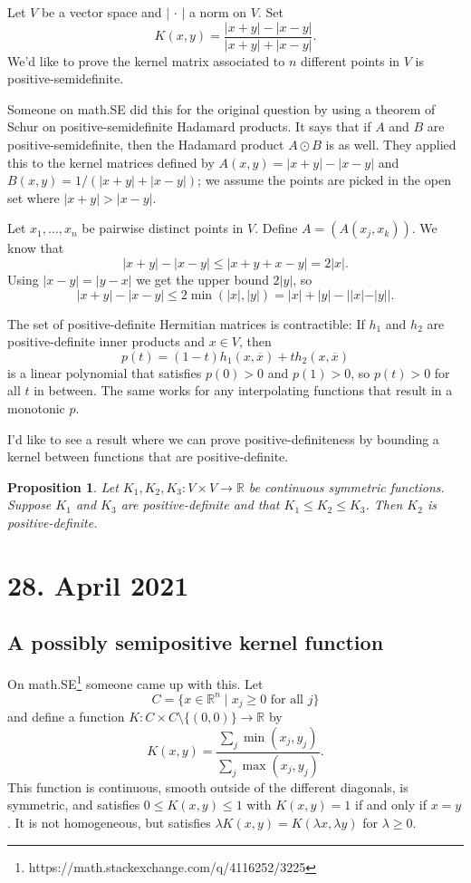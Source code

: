 \documentclass[11pt]{article}
\newtheorem{prop}[theo]{Proposition}
\theoremstyle{definition}
\newcommand{\kk}[1]{\mathbb{#1}}
\def\ov#1{\overline{#1}}
\begin{document}
Let $V$ be a vector space and $| \, \cdot \, |$ a norm on $V$. Set
\[
K(x,y) = \frac{|x+y|-|x-y|}{|x+y|+|x-y|}.
\]
We'd like to prove the kernel matrix associated to $n$ different points in $V$ is positive-semidefinite.

Someone on math.SE did this for the original question by using a theorem of Schur on positive-semidefinite Hadamard products. It says that if $A$ and $B$ are positive-semidefinite, then the Hadamard product $A \odot B$ is as well. They applied this to the kernel matrices defined by $A(x,y) = |x+y|-|x-y|$ and $B(x,y) = 1/(|x+y|+|x-y|)$; we assume the points are picked in the open set where $|x+y| > |x-y|$.

Let $x_1,\ldots,x_n$ be pairwise distinct points in $V$. Define
\(
A = (A(x_j,x_k))
\).
We know that
\[
|x+y|-|x-y| \leq |x + y + x - y| = 2 |x|.
\]
Using $|x-y|=|y-x|$ we get the upper bound $2|y|$, so
\[
|x+y|-|x-y| \leq 2 \min(|x|,|y|) = |x| + |y| - ||x| - |y||.
\]

The set of positive-definite Hermitian matrices is contractible: If $h_1$ and $h_2$ are positive-definite inner products and $x \in V$, then
\[
p(t) = (1-t) h_1(x, \ov x) + t h_2(x, \ov x)
\]
is a linear polynomial that satisfies $p(0) > 0$ and $p(1) > 0$, so $p(t) > 0$ for all $t$ in between. The same works for any interpolating functions that result in a monotonic $p$.



I'd like to see a result where we can prove positive-definiteness by bounding a kernel between functions that are positive-definite.

\begin{prop}
Let $K_1, K_2, K_3 : V \times V \to \kk R$ be continuous symmetric functions. Suppose $K_1$ and $K_3$ are positive-definite and that $K_1 \leq K_2 \leq K_3$. Then $K_2$ is positive-definite.
\end{prop}


\section*{28. April 2021}
\subsection*{A possibly semipositive kernel function}

On math.SE\footnote{https://math.stackexchange.com/q/4116252/3225} someone came up with this. Let
\[
C = \{ x \in \kk R^n \mid x_j \geq 0 \text{ for all $j$}\}
\]
and define a function $K : C \times C \setminus \{(0,0)\} \to \kk R$ by
\[
K(x,y) = \frac{\sum_{j} \min(x_j, y_j)}{\sum_j \max(x_j, y_j)}.
\]
This function is continuous, smooth outside of the different diagonals, is symmetric, and satisfies $0 \leq K(x,y) \leq 1$ with $K(x,y) = 1$ if and only if $x = y$. It is not homogeneous, but satisfies $\lambda K(x,y) = K(\lambda x, \lambda y)$ for $\lambda \geq 0$.
\end{document}
